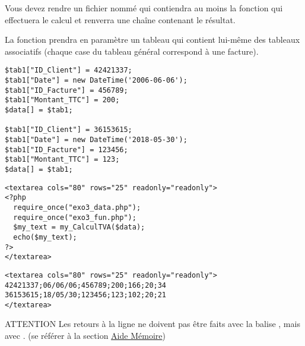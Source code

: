 \bigskip

\noindent Vous devez rendre un fichier nommé  qui contiendra au moins la fonction  qui effectuera le calcul et renverra une chaîne contenant le résultat.

\noindent La fonction prendra en paramètre un tableau qui contient lui-même des tableaux associatifs (chaque case du tableau général correspond à une facture).

\bigskip

\lstset{language=php}
\begin{lstlisting}[frame=single,title={Tableau en entrée (exo3\_data.php)}]
$tab1["ID_Client"] = 42421337;
$tab1["Date"] = new DateTime('2006-06-06');
$tab1["ID_Facture"] = 456789;
$tab1["Montant_TTC"] = 200;
$data[] = $tab1;

$tab1["ID_Client"] = 36153615;
$tab1["Date"] = new DateTime('2018-05-30');
$tab1["ID_Facture"] = 123456;
$tab1["Montant_TTC"] = 123;
$data[] = $tab1;
\end{lstlisting}

\lstset{language=php}
\begin{lstlisting}[frame=single,title={Appel de la fonction}]
<textarea cols="80" rows="25" readonly="readonly">
<?php
  require_once("exo3_data.php");
  require_once("exo3_fun.php");
  $my_text = my_CalculTVA($data);
  echo($my_text);
?>
</textarea>
\end{lstlisting}

\lstset{language=php}
\begin{lstlisting}[frame=single,title={Sortie HTML attendue}]
<textarea cols="80" rows="25" readonly="readonly">
42421337;06/06/06;456789;200;166;20;34
36153615;18/05/30;123456;123;102;20;21
</textarea>
\end{lstlisting}

\bigskip

\begin{RedBoxTitle}{ATTENTION}
    Les retours à la ligne ne doivent pas être faits avec la balise , mais avec .
    (se référer à la section \hyperref[sec:AideMemoire]{Aide Mémoire})
\end{RedBoxTitle}